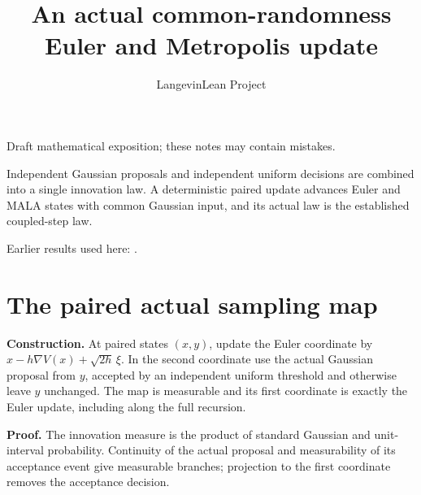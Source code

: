 \documentclass[11pt,a4paper]{article}
\title{\texorpdfstring{An actual common-randomness Euler and Metropolis update}{An actual common-randomness Euler and Metropolis update}}
\author{LangevinLean Project}
\date{}
\begin{document}
\maketitle
Draft mathematical exposition; these notes may contain mistakes.


Independent Gaussian proposals and independent uniform decisions are combined into a single innovation law. A deterministic paired update advances Euler and MALA states with common Gaussian input, and its actual law is the established coupled-step law.



Earlier results used here: \cite[Section~3.33]{LangevinLean2026ULASC}.

\section{\texorpdfstring{The paired actual sampling map}{The paired actual sampling map}}


\textbf{Construction.} At paired states \((x,y)\), update the Euler coordinate by \(x-h\nabla V(x)+\sqrt{2h}\,\xi\). In the second coordinate use the actual Gaussian proposal from \(y\), accepted by an independent uniform threshold and otherwise leave \(y\) unchanged. The map is measurable and its first coordinate is exactly the Euler update, including along the full recursion.



\textbf{Proof.} The innovation measure is the product of standard Gaussian and unit-interval probability. Continuity of the actual proposal and measurability of its acceptance event give measurable branches; projection to the first coordinate removes the acceptance decision.
\end{document}
